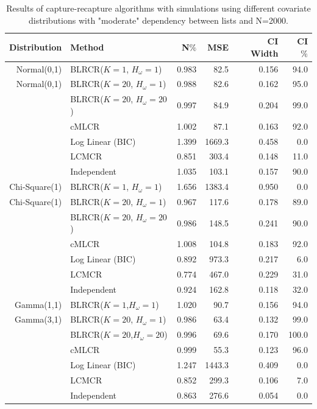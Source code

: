 \documentclass[
  12pt,
]{article}
\begin{document}
\begin{table}[H]
\centering
\begin{tabular}{||r l r r r r||} 
 \hline
Distribution & Method & N$\%$ &MSE & CI Width & CI $\%$   \\ [0.5ex] 
 \hline\hline
 Normal(0,1)   & BLRCR($K=1$, $H_\omega=1$)  & 0.983   & 82.5   & 0.156   & 94.0 \\ 
 Normal(0,1)   & BLRCR($K=20$, $H_\omega=1$)    & 0.988     & 82.6     & 0.162     & 95.0 \\ 
               & BLRCR($K=20$, $H_\omega=20$)    & 0.997     & 84.9     & 0.204     & 99.0 \\
               & cMLCR       & 1.002       & 87.1      & 0.163      & 92.0 \\
               & Log Linear (BIC)  & 1.399      & 1669.3     & 0.458     & 0.0 \\ 
               & LCMCR       & 0.851       & 303.4      & 0.148      & 11.0 \\ 
               & Independent & 1.035 & 103.1& 0.157& 90.0 \\ 


 \hline
 Chi-Square(1)   & BLRCR($K=1$, $H_\omega=1$)  & 1.656   & 1383.4   & 0.950   & 0.0 \\ 
 Chi-Square(1)   & BLRCR($K=20$, $H_\omega=1$)    & 0.967     & 117.6     & 0.178     & 89.0 \\ 
                 & BLRCR($K=20$, $H_\omega=20$)    & 0.986     & 148.5     & 0.241     & 90.0 \\
               & cMLCR       & 1.008       & 104.8      & 0.183      & 92.0 \\
               & Log Linear (BIC)  & 0.892      & 973.3     & 0.217     & 6.0 \\ 
               & LCMCR       & 0.774       & 467.0      & 0.229      & 31.0 \\ 
               & Independent & 0.924 & 162.8& 0.118& 32.0 \\ 


 \hline
 Gamma(1,1)    & BLRCR($K=1$,$H_\omega=1$)  & 1.020   & 90.7   & 0.156   & 94.0 \\ 
 Gamma(3,1)    & BLRCR($K=20$, $H_\omega=1$)    & 0.986     & 63.4     & 0.132     & 99.0 \\ 
               & BLRCR($K=20$,$H_\omega=20$)    & 0.996     & 69.6     & 0.170     & 100.0 \\
               & cMLCR       & 0.999       & 55.3      & 0.123      & 96.0 \\
               & Log Linear (BIC)  & 1.247      & 1443.3     & 0.409     & 0.0 \\ 
               & LCMCR       & 0.852       & 299.3      & 0.106      & 7.0 \\ 
               & Independent & 0.863 & 276.6& 0.054& 0.0 \\ 
 \hline
\end{tabular}
\caption{Results of capture-recapture algorithms with simulations using different covariate distributions with "moderate" dependency between lists and N=2000.}
\label{table:diffdists}
\end{table}
\end{document}
